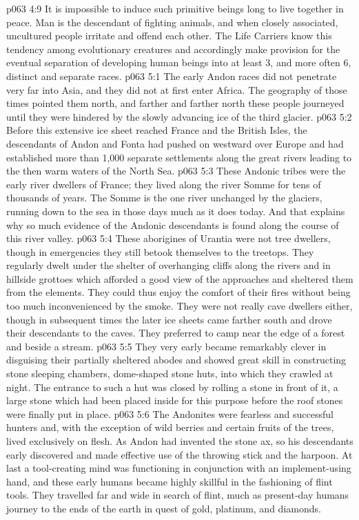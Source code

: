 \vs p063 4:9 It is impossible to induce such primitive beings long to live together in peace. Man is the descendant of fighting animals, and when closely associated, uncultured people irritate and offend each other. The Life Carriers know this tendency among evolutionary creatures and accordingly make provision for the eventual separation of developing human beings into at least 3, and more often 6, distinct and separate races.
\vs p063 5:1 The early Andon races did not penetrate very far into Asia, and they did not at first enter Africa. The geography of those times pointed them north, and farther and farther north these people journeyed until they were hindered by the slowly advancing ice of the third glacier.
\vs p063 5:2 Before this extensive ice sheet reached France and the British Isles, the descendants of Andon and Fonta had pushed on westward over Europe and had established more than 1,000 separate settlements along the great rivers leading to the then warm waters of the North Sea.
\vs p063 5:3 These Andonic tribes were the early river dwellers of France; they lived along the river Somme for tens of thousands of years. The Somme is the one river unchanged by the glaciers, running down to the sea in those days much as it does today. And that explains why so much evidence of the Andonic descendants is found along the course of this river valley.
\vs p063 5:4 These aborigines of Urantia were not tree dwellers, though in emergencies they still betook themselves to the treetops. They regularly dwelt under the shelter of overhanging cliffs along the rivers and in hillside grottoes which afforded a good view of the approaches and sheltered them from the elements. They could thus enjoy the comfort of their fires without being too much inconvenienced by the smoke. They were not really cave dwellers either, though in subsequent times the later ice sheets came farther south and drove their descendants to the caves. They preferred to camp near the edge of a forest and beside a stream.
\vs p063 5:5 They very early became remarkably clever in disguising their partially sheltered abodes and showed great skill in constructing stone sleeping chambers, dome\hyp{}shaped stone huts, into which they crawled at night. The entrance to such a hut was closed by rolling a stone in front of it, a large stone which had been placed inside for this purpose before the roof stones were finally put in place.
\vs p063 5:6 The Andonites were fearless and successful hunters and, with the exception of wild berries and certain fruits of the trees, lived exclusively on flesh. As Andon had invented the stone ax, so his descendants early discovered and made effective use of the throwing stick and the harpoon. At last a tool\hyp{}creating mind was functioning in conjunction with an implement\hyp{}using hand, and these early humans became highly skillful in the fashioning of flint tools. They travelled far and wide in search of flint, much as present\hyp{}day humans journey to the ends of the earth in quest of gold, platinum, and diamonds.
